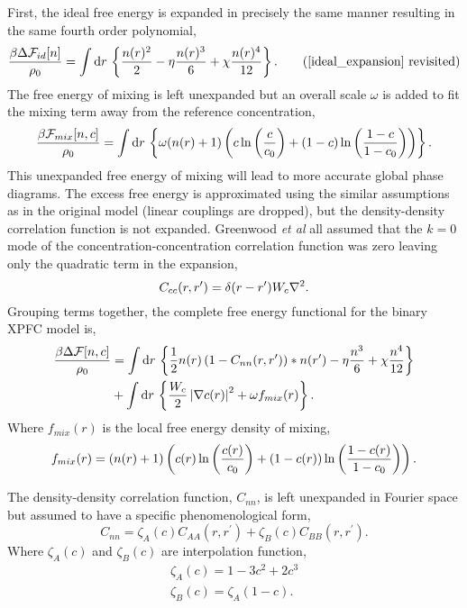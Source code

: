 First, the ideal free energy is expanded in precisely the same manner resulting
in the same fourth order polynomial,
%
\begin{equation}
    \f{\beta\Delta\F_{id}[n]}{\rho_0} = \integrate{r}
        \l\lbrace \f{n(r)^2}{2} - \eta \f{n(r)^3}{6} + \chi\f{n(r)^4}{12}
        \r\rbrace. \tag{\ref{ideal_expansion} revisited}
\end{equation}
%
The free energy of mixing is left unexpanded but an overall scale $\omega$ is
added to fit the mixing term away from the reference concentration,
%
\begin{equation}
    \frac{\beta\mathcal{F}_{mix}[n, c]}{\rho_0} =
        \int \mathrm{d}r\, \left\lbrace \omega (n(r) + 1)\left( 
            c\ln\left(\frac{c}{c_0}\right) + (1-c)\ln\left(\frac{1-c}{1-c_0}\right) \right)\right\rbrace. 
\end{equation}
%
This unexpanded free energy of mixing will lead to more accurate global phase
diagrams. The excess free energy is approximated using the similar assumptions
as in the original model (linear couplings are dropped), but the density-density
correlation function is not expanded. Greenwood \textit{et al} all assumed that
the $k=0$ mode of the concentration-concentration correlation function was zero
leaving only the quadratic term in the expansion,
%
\begin{equation}
    C_{cc}(r, r^\prime) = \delta(r - r^\prime)W_c \nabla^2.
\end{equation}
%
Grouping terms together, the complete free energy functional for the binary XPFC
model is,
%
\begin{align}
    \frac{\beta\Delta\mathcal{F}[n, c]}{\rho_0} &= \int \mathrm{d}r\, \left\lbrace
        \frac{1}{2} n(r) \left(1 - C_{nn}(r, r^\prime)\right) \ast n(r^\prime)
        - \eta \frac{n^3}{6} + \chi \frac{n^4}{12} \right\rbrace \\
        &+ \int \mathrm{d}r\,\left\lbrace
            \frac{W_c}{2}\left\vert \nabla c(r) \right\vert^2 + \omega f_{mix}(r)
            \right\rbrace. \nonumber
\end{align}
%
Where $f_{mix}(r)$ is the local free energy density of mixing,
%
\begin{equation}
    f_{mix}(r) = \left(n(r) + 1\right)\left( 
            c(r)\ln\left(\frac{c(r)}{c_0}\right) + (1-c(r))\ln\left(\frac{1-c(r)}{1-c_0}\right) \right).
\end{equation}
%

The density-density correlation function, $C_{nn}$, is left unexpanded in 
Fourier space but assumed to have a specific phenomenological form,
%
\begin{equation}
    \label{eq:xpfc_corr}
    C_{nn} = \zeta_A(c) C_{AA}(r, r^\prime) 
           + \zeta_B(c) C_{BB}(r, r^\prime).
\end{equation}
%
Where $\zeta_A(c)$ and $\zeta_B(c)$ are interpolation function,
%
\begin{gather}
    \zeta_A(c) = 1 - 3c^2 + 2c^3 \\
    \zeta_B(c) = \zeta_A(1 - c).
\end{gather}
%

